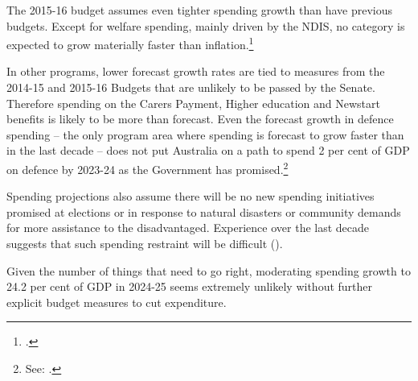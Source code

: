 \documentclass[twoside,english]{grattanBudgetRepairb5portrait}
\begin{document}
The 2015-16 budget assumes even tighter spending growth than have previous budgets. Except for welfare spending, mainly driven by the NDIS, no category is expected to grow materially faster than inflation.\footcite[][BP No.~1, pp.~5-11]{Treasury2015BudgetPapers201516}  

In other programs, lower forecast growth rates are tied to measures from the 2014-15 and 2015-16 Budgets that are unlikely to be passed by the Senate. Therefore spending on the Carers Payment, Higher education and Newstart benefits is likely to be more than forecast\DEVIATION{}. Even the forecast growth in defence spending – the only program area where spending is forecast to grow faster than in the last decade – does not put Australia on a path to spend 2 per cent of GDP on defence by 2023-24 as the Government has promised.\footnote{See: \textcite[][1]{Defence2014}.} 


Spending projections also assume there will be no new spending initiatives promised at elections or in response to natural disasters or community demands for more assistance to the disadvantaged. Experience over the last decade suggests that such spending restraint will be difficult ().

Given the number of things that need to go right, moderating spending growth to 24.2 per cent of GDP in 2024-25 seems extremely unlikely without further explicit budget measures to cut expenditure.
\end{document}
